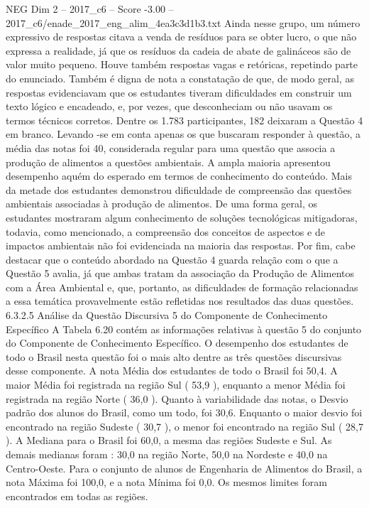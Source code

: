 \begin{textsample}{NEG Dim 2 – 2017\_c6 – Score -3.00 – 2017\_c6/enade\_2017\_eng\_alim\_4ea3c3d1b3.txt}
Ainda nesse grupo, um número expressivo de respostas citava a venda de resíduos para se obter lucro, o que não expressa a realidade, já que os resíduos da cadeia de abate de galináceos são de valor muito pequeno.
Houve também respostas vagas e retóricas, repetindo parte do enunciado.
Também é digna de nota a constatação de que, de modo geral, as respostas evidenciavam que os estudantes tiveram dificuldades em construir um texto lógico e encadeado, e, por vezes, que desconheciam ou não usavam os termos técnicos corretos.
Dentre os 1.783 participantes, 182 deixaram a Questão 4 em branco.
Levando -se em conta apenas os que buscaram responder à questão, a média das notas foi 40, considerada regular para uma questão que associa a produção de alimentos a questões ambientais.
A ampla maioria apresentou desempenho aquém do esperado em termos de conhecimento do conteúdo.
Mais da metade dos estudantes demonstrou dificuldade de compreensão das questões ambientais associadas à produção de alimentos.
De uma forma geral, os estudantes mostraram algum conhecimento de soluções tecnológicas mitigadoras, todavia, como mencionado, a compreensão dos conceitos de aspectos e de impactos ambientais não foi evidenciada na maioria das respostas.
Por fim, cabe destacar que o conteúdo abordado na Questão 4 guarda relação com o que a Questão 5 avalia, já que ambas tratam da associação da Produção de Alimentos com a Área Ambiental e, que, portanto, as dificuldades de formação relacionadas a essa temática provavelmente estão refletidas nos resultados das duas questões. 6.3.2.5 Análise da Questão Discursiva 5 do Componente de Conhecimento Específico A Tabela 6.20 contém as informações relativas à questão 5 do conjunto do Componente de Conhecimento Específico.
O desempenho dos estudantes de todo o Brasil nesta questão foi o mais alto dentre as três questões discursivas desse componente.
A nota Média dos estudantes de todo o Brasil foi 50,4.
A maior Média foi registrada na região Sul ( 53,9 ), enquanto a menor Média foi registrada na região Norte ( 36,0 ).
Quanto à variabilidade das notas, o Desvio padrão dos alunos do Brasil, como um todo, foi 30,6.
Enquanto o maior desvio foi encontrado na região Sudeste ( 30,7 ), o menor foi encontrado na região Sul ( 28,7 ).
A Mediana para o Brasil foi 60,0, a mesma das regiões Sudeste e Sul.
As demais medianas foram : 30,0 na região Norte, 50,0 na Nordeste e 40,0 na Centro-Oeste.
Para o conjunto de alunos de Engenharia de Alimentos do Brasil, a nota Máxima foi 100,0, e a nota Mínima foi 0,0.
Os mesmos limites foram encontrados em todas as regiões.

\end{textsample}
